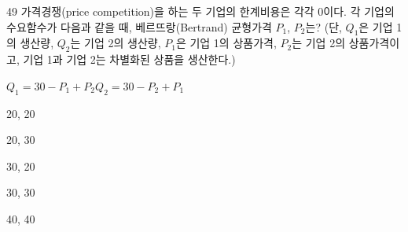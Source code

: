 \begin{question}{49}
가격경쟁(price competition)을 하는 두 기업의 한계비용은 각각 0이다. 각 기업의 수요함수가 다음과 같을 때, 베르뜨랑(Bertrand) 균형가격 $P_{1}$, $P_{2}$는? (단, $Q_{1}$은 기업 1의 생산량, $Q_{2}$는 기업 2의 생산량, $P_{1}$은 기업 1의 상품가격, $P_{2}$는 기업 2의 상품가격이고, 기업 1과 기업 2는 차별화된 상품을 생산한다.)
\begin{framedtext}
\centering $Q_{1}=30-P_{1}+P_{2}$\qquad\qquad\qquad $Q_{2}=30-P_{2}+P_{1}$
\end{framedtext}
\begin{choices}
  \item 20, 20
  \item 20, 30
  \item 30, 20
  \item 30, 30
  \item 40, 40
\end{choices}
\end{question}

